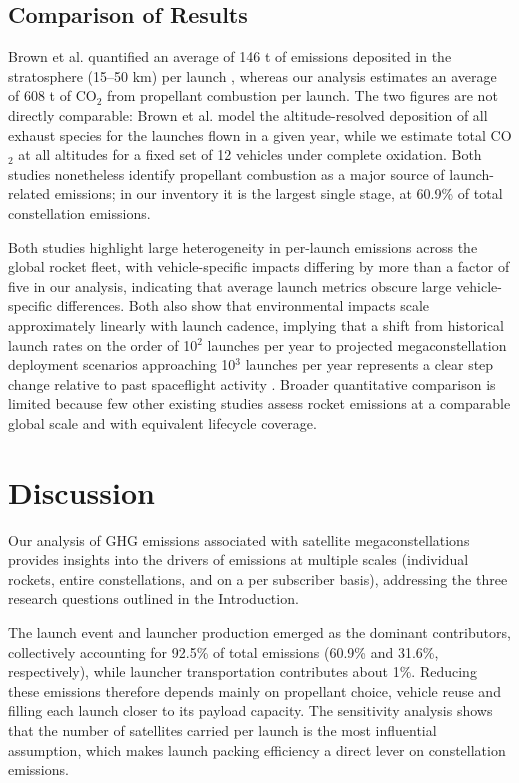 \documentclass[pdflatex,sn-mathphys-num]{sn-jnl}
\theoremstyle{thmstyleone}%
\theoremstyle{thmstyletwo}%
\theoremstyle{thmstylethree}%
\begin{document}
\subsection{Comparison of Results}
Brown et al. quantified an average of 146 t of emissions deposited in the stratosphere (15--50 km) per launch \citep{brown_worldwide_2024}, whereas our analysis estimates an average of 608 t of CO$_2$ from propellant combustion per launch. The two figures are not directly comparable: Brown et al. model the altitude-resolved deposition of all exhaust species for the launches flown in a given year, while we estimate total CO$_2$ at all altitudes for a fixed set of 12 vehicles under complete oxidation. Both studies nonetheless identify propellant combustion as a major source of launch-related emissions; in our inventory it is the largest single stage, at 60.9\% of total constellation emissions.

Both studies highlight large heterogeneity in per-launch emissions across the global rocket fleet, with vehicle-specific impacts differing by more than a factor of five in our analysis, indicating that average launch metrics obscure large vehicle-specific differences. Both also show that environmental impacts scale approximately linearly with launch cadence, implying that a shift from historical launch rates on the order of 10$^2$ launches per year to projected megaconstellation deployment scenarios approaching 10$^3$ launches per year represents a clear step change relative to past spaceflight activity \citep{brown_worldwide_2024}. Broader quantitative comparison is limited because few other existing studies assess rocket emissions at a comparable global scale and with equivalent lifecycle coverage.

\section{Discussion}\label{sec6}

Our analysis of GHG emissions associated with satellite megaconstellations provides insights into the drivers of emissions at multiple scales (individual rockets, entire constellations, and on a per subscriber basis), addressing the three research questions outlined in the Introduction.

The launch event and launcher production emerged as the dominant contributors, collectively accounting for 92.5\% of total emissions (60.9\% and 31.6\%, respectively), while launcher transportation contributes about 1\%. Reducing these emissions therefore depends mainly on propellant choice, vehicle reuse and filling each launch closer to its payload capacity. The sensitivity analysis shows that the number of satellites carried per launch is the most influential assumption, which makes launch packing efficiency a direct lever on constellation emissions.
\end{document}
